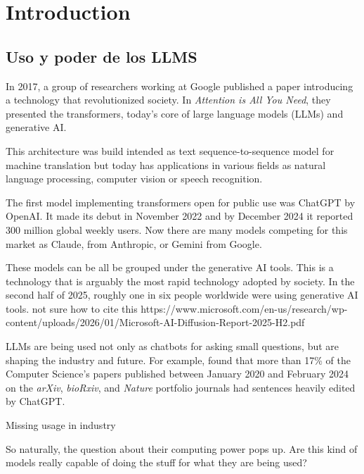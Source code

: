 \chapter{Introduction}

\section{Uso y poder de los LLMS}


In 2017, a group of researchers working at Google published a paper introducing a technology that revolutionized society.
In \textit{Attention is All You Need}, they presented the transformers, today's core of large language models (LLMs) and generative AI.

This architecture was build intended as text sequence-to-sequence model for machine translation but today has applications in various fields as natural language processing, computer vision or speech recognition.

The first model implementing transformers open for public use was ChatGPT by OpenAI.
It made its debut in November 2022 and by December 2024 it reported 300 million global weekly users.
Now there are many models competing for this market as Claude, from Anthropic, or Gemini from Google.

These models can be all be grouped under the generative AI tools.
This is a technology that is arguably the most rapid technology adopted by society.
In the second half of 2025, roughly one in six people worldwide were using generative AI tools. {\color{orange} not sure how to cite this https://www.microsoft.com/en-us/research/wp-content/uploads/2026/01/Microsoft-AI-Diffusion-Report-2025-H2.pdf}

LLMs are being used not only as chatbots for asking small questions, but are shaping the industry and future.
For example, \cite{liang2024mappingincreasingusellms} found that more than 17\% of the Computer Science's papers published between January 2020 and February 2024 on the \textit{arXiv}, \textit{bioRxiv}, and \textit{Nature} portfolio journals had sentences heavily edited by ChatGPT. 


{\color{orange} Missing usage in industry}



So naturally, the question about their computing power pops up. Are this kind of models really capable of doing the stuff for what they are being used?







